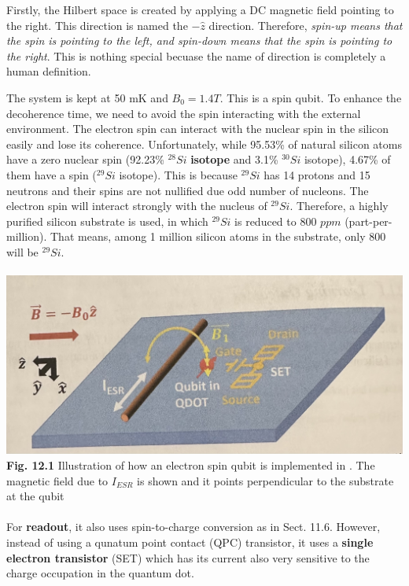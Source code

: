 \documentclass{article}
\begin{document}
Firstly, the Hilbert space is created by applying a DC magnetic field pointing to the right.
This direction is named the $-\hat{z}$ direction. Therefore, \textit{spin-up means that the spin is 
pointing to the left, and spin-down means that the spin is pointing to the right}. This is nothing
special becuase the name of direction is completely a human definition.

The system is kept at 50 mK and $B_0=1.4T$. This is a spin qubit. To enhance the decoherence
time, we need to avoid the spin interacting with the external environment. The electron spin can
interact with the nuclear spin in the silicon easily and lose its coherence.
Unfortunately, while 95.53\% of natural silicon atoms have a zero nuclear spin
(92.23\% $^{28}Si$ \textbf{isotope} and 3.1\% $^{30}Si$ isotope), 4.67\% of them have
a spin ($^{29}Si$ isotope). This is because $^{29}Si$ has 14 protons and 15 neutrons
and their spins are not nullified due odd number of nucleons. The electron spin will interact
strongly with the nucleus of $^29Si$. Therefore, a highly purified silicon substrate is used,
in which $^29Si$ is reduced to 800 $ppm$ (part-per-million). That means, among 1 million silicon
atoms in the substrate, only 800 will be $^{29}Si$.
\\\\

      \includegraphics[scale=0.55]{Fig.12.1.jpeg}\\
\textbf{Fig. 12.1} Illustration of how an electron spin qubit is implemented in 
  \cite{veldhorst2014addressable}. The magnetic field due to $I_{ESR}$ is shown and it points
  perpendicular to the substrate at the qubit
\\\\

For \textbf{readout}, it also uses spin-to-charge conversion as in Sect. 11.6. However, instead of using a 
qunatum point contact (QPC) transistor, it uses a \textbf{single electron transistor} (SET) which has its current
also very sensitive to the charge occupation in the quantum dot.
\end{document}
